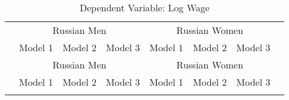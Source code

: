 \begin{longtable}{l*{3}{c}|l*{3}{c}}
	\caption{Dependent Variable: Log Wage}\\
\toprule
& \multicolumn{3}{c|}{Russian Men} & \multicolumn{3}{c}{Russian Women} \\
&\multicolumn{1}{c}{Model 1}&\multicolumn{1}{c}{Model 2}&\multicolumn{1}{c|}{Model 3}&\multicolumn{1}{c}{Model 1}&\multicolumn{1}{c}{Model 2}&\multicolumn{1}{c}{Model 3}\\ 
\midrule
\endfirsthead
\toprule
& \multicolumn{3}{c|}{Russian Men} & \multicolumn{3}{c}{Russian Women} \\
&\multicolumn{1}{c}{Model 1}&\multicolumn{1}{c}{Model 2}&\multicolumn{1}{c|}{Model 3}&\multicolumn{1}{c}{Model 1}&\multicolumn{1}{c}{Model 2}&\multicolumn{1}{c}{Model 3}\\
\midrule
\endhead
\midrule
\endfoot
\bottomrule
\endlastfoot
	

\end{longtable}
